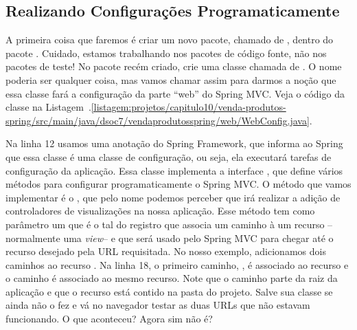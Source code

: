 \subsection{Realizando Configurações Programaticamente}

A primeira coisa que faremos é criar um novo pacote, chamado de , dentro do pacote . Cuidado, estamos trabalhando nos pacotes de código fonte, não nos pacotes de teste! No pacote  recém criado, crie uma classe chamada de . O nome poderia ser qualquer coisa, mas vamos chamar assim para darmos a noção que essa classe fará a configuração da parte ``web'' do Spring MVC. Veja o código da classe na Listagem~\thechapter.\ref{listagem:projetos/capitulo10/venda-produtos-spring/src/main/java/dsoc7/vendaprodutosspring/web/WebConfig.java}.


Na linha 12 usamos uma anotação  do Spring Framework, que informa ao Spring que essa classe é uma classe de configuração, ou seja, ela executará tarefas de configuração da aplicação. Essa classe implementa a interface , que define vários métodos para configurar programaticamente o Spring MVC. O método que vamos implementar é o , que pelo nome podemos perceber que irá realizar a adição de controladores de visualizações na nossa aplicação. Esse método tem como parâmetro um  que é o tal do registro que associa um caminho à um recurso --normalmente uma \textit{view}-- e que será usado pelo Spring MVC para chegar até o recurso desejado pela URL requisitada. No nosso exemplo, adicionamos dois caminhos ao recurso . Na linha 18, o primeiro caminho, , é associado ao recurso  e o caminho  é associado ao mesmo recurso. Note que o caminho parte da raiz da aplicação e que o recurso está contido na pasta  do projeto. Salve sua classe se ainda não o fez e vá no navegador testar as duas URLs que não estavam funcionando. O que aconteceu? Agora sim não é?



